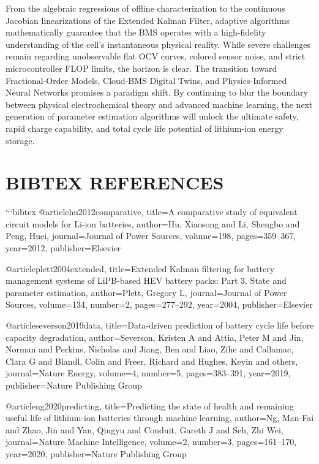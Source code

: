 From the algebraic regressions of offline characterization to the continuous Jacobian linearizations of the Extended Kalman Filter, adaptive algorithms mathematically guarantee that the BMS operates with a high-fidelity understanding of the cell's instantaneous physical reality. While severe challenges remain regarding unobservable flat OCV curves, colored sensor noise, and strict microcontroller FLOP limits, the horizon is clear. The transition toward Fractional-Order Models, Cloud-BMS Digital Twins, and Physics-Informed Neural Networks promises a paradigm shift. By continuing to blur the boundary between physical electrochemical theory and advanced machine learning, the next generation of parameter estimation algorithms will unlock the ultimate safety, rapid charge capability, and total cycle life potential of lithium-ion energy storage.

\section*{BIBTEX REFERENCES}

```bibtex
@article{hu2012comparative,
  title={A comparative study of equivalent circuit models for Li-ion batteries},
  author={Hu, Xiaosong and Li, Shengbo and Peng, Huei},
  journal={Journal of Power Sources},
  volume={198},
  pages={359--367},
  year={2012},
  publisher={Elsevier}
}

@article{plett2004extended,
  title={Extended Kalman filtering for battery management systems of LiPB-based HEV battery packs: Part 3. State and parameter estimation},
  author={Plett, Gregory L},
  journal={Journal of Power Sources},
  volume={134},
  number={2},
  pages={277--292},
  year={2004},
  publisher={Elsevier}
}

@article{severson2019data,
  title={Data-driven prediction of battery cycle life before capacity degradation},
  author={Severson, Kristen A and Attia, Peter M and Jin, Norman and Perkins, Nicholas and Jiang, Ben and Liao, Zihe and Callamac, Clara G and Blandl, Colin and Freer, Richard and Hughes, Kevin and others},
  journal={Nature Energy},
  volume={4},
  number={5},
  pages={383--391},
  year={2019},
  publisher={Nature Publishing Group}
}

@article{ng2020predicting,
  title={Predicting the state of health and remaining useful life of lithium-ion batteries through machine learning},
  author={Ng, Man-Fai and Zhao, Jin and Yan, Qingyu and Conduit, Gareth J and Seh, Zhi Wei},
  journal={Nature Machine Intelligence},
  volume={2},
  number={3},
  pages={161--170},
  year={2020},
  publisher={Nature Publishing Group}
}

